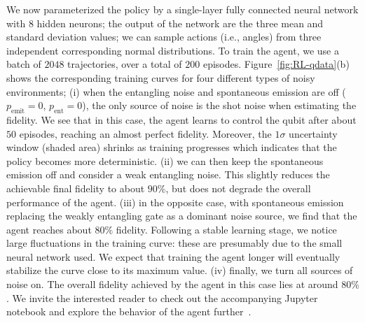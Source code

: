We now parameterized the policy by a single-layer fully connected neural network with $8$ hidden neurons; the output of the network are the three mean and standard deviation values; we can sample actions (i.e., angles) from three independent corresponding normal distributions. To train the agent, we use a batch of $2048$ trajectories, over a total of $200$ episodes. Figure~\ref{fig:RL-qdata}(b) shows the corresponding training curves for four different types of noisy environments;
(i) when the entangling noise and spontaneous emission are off ($p_\text{emit}=0$, $p_\text{ent}=0$), the only source of noise is the shot noise when estimating the fidelity. We see that in this case, the agent learns to control the qubit after about $50$ episodes, reaching an almost perfect fidelity. Moreover, the $1\sigma$ uncertainty window (shaded area) shrinks as training progresses which indicates that the policy becomes more deterministic. 
(ii) we can then keep the spontaneous emission off and consider a weak entangling noise. This slightly reduces the achievable final fidelity to about $90\%$, but does not degrade the overall performance of the agent. 
(iii) in the opposite case, with spontaneous emission replacing the weakly entangling gate as a dominant noise source, we find that the agent reaches about $80\%$ fidelity. Following a stable learning stage, we notice large fluctuations in the training curve: these are presumably due to the small neural network used. We expect that training the agent longer will eventually stabilize the curve close to its maximum value.
(iv) finally, we turn all sources of noise on. The overall fidelity achieved by the agent in this case lies at around $80\%$. 
We invite the interested reader to check out the accompanying Jupyter notebook and explore the behavior of the agent further~\cite{github_code}.


